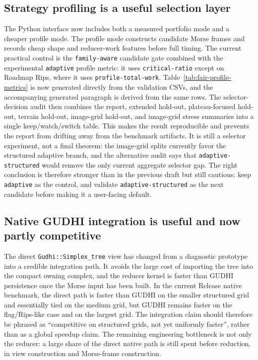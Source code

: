 \documentclass[11pt]{article}
\begin{document}
\subsection{Strategy profiling is a useful selection layer}
The Python interface now includes both a measured portfolio mode and a cheaper profile
mode.  The profile mode constructs candidate Morse frames and records cheap shape and
reducer-work features before full timing.  The current practical control is the
\texttt{family-aware} candidate gate combined with the experimental \texttt{adaptive}
profile metric: it uses \texttt{critical-ratio} except on Roadmap Rips, where it uses
\texttt{profile-total-work}.  Table~\ref{tab:fair-profile-metrics} is now
generated directly from the validation CSVs, and the accompanying generated paragraph is
derived from the same rows.  The selector-decision audit then combines the report,
extended hold-out, plateau-focused hold-out, terrain hold-out, image-grid hold-out, and
image-grid stress summaries into a single keep/watch/switch table.  This makes the result reproducible and
prevents the report from drifting away from the benchmark artifacts.  It is still a
selector experiment, not a final theorem: the image-grid splits currently favor the
structured adaptive branch, and the alternative audit says that \texttt{adaptive-structured}
would remove the only current aggregate selector gap.  The right conclusion is therefore
stronger than in the previous draft but still cautious: keep \texttt{adaptive} as the
control, and validate \texttt{adaptive-structured} as the next candidate before making it a
user-facing default.

\subsection{Native GUDHI integration is useful and now partly competitive}
The direct \texttt{Gudhi::Simplex\_tree} view has changed from a diagnostic prototype into
a credible integration path.  It avoids the large cost of importing the tree into the
compact owning complex, and the reducer kernel is faster than GUDHI persistence once the
Morse input has been built.  In the current Release native benchmark, the direct path is
faster than GUDHI on the smaller structured grid and essentially tied on the medium grid,
but GUDHI remains faster on the flag/Rips-like case and on the largest grid.  The
integration claim should therefore be phrased as ``competitive on structured grids, not
yet uniformly faster'', rather than as a global speedup claim.  The remaining engineering
bottleneck is not only the reducer: a large share of the direct native path is still spent
before reduction, in view construction and Morse-frame construction.
\end{document}
